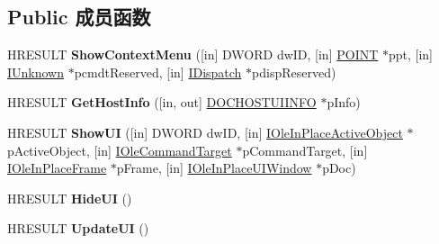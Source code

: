 \subsection*{Public 成员函数}
\begin{DoxyCompactItemize}
\item 
\mbox{\label{interface_i_doc_host_u_i_handler_a4e5a7503b05be4342bed42a992243621}} 
H\+R\+E\+S\+U\+LT {\bfseries Show\+Context\+Menu} (\mbox{[}in\mbox{]} D\+W\+O\+RD dw\+ID, \mbox{[}in\mbox{]} \hyperlink{structtag_p_o_i_n_t}{P\+O\+I\+NT} $\ast$ppt, \mbox{[}in\mbox{]} \hyperlink{interface_i_unknown}{I\+Unknown} $\ast$pcmdt\+Reserved, \mbox{[}in\mbox{]} \hyperlink{interface_i_dispatch}{I\+Dispatch} $\ast$pdisp\+Reserved)
\item 
\mbox{\label{interface_i_doc_host_u_i_handler_a50a5fd8bb9006df44c170c74c1586d5d}} 
H\+R\+E\+S\+U\+LT {\bfseries Get\+Host\+Info} (\mbox{[}in, out\mbox{]} \hyperlink{struct_i_doc_host_u_i_handler_1_1___d_o_c_h_o_s_t_u_i_i_n_f_o}{D\+O\+C\+H\+O\+S\+T\+U\+I\+I\+N\+FO} $\ast$p\+Info)
\item 
\mbox{\label{interface_i_doc_host_u_i_handler_af5382165442406ea798d48e0fa2e3735}} 
H\+R\+E\+S\+U\+LT {\bfseries Show\+UI} (\mbox{[}in\mbox{]} D\+W\+O\+RD dw\+ID, \mbox{[}in\mbox{]} \hyperlink{interface_i_ole_in_place_active_object}{I\+Ole\+In\+Place\+Active\+Object} $\ast$p\+Active\+Object, \mbox{[}in\mbox{]} \hyperlink{interface_i_ole_command_target}{I\+Ole\+Command\+Target} $\ast$p\+Command\+Target, \mbox{[}in\mbox{]} \hyperlink{interface_i_ole_in_place_frame}{I\+Ole\+In\+Place\+Frame} $\ast$p\+Frame, \mbox{[}in\mbox{]} \hyperlink{interface_i_ole_in_place_u_i_window}{I\+Ole\+In\+Place\+U\+I\+Window} $\ast$p\+Doc)
\item 
\mbox{\label{interface_i_doc_host_u_i_handler_aa6e932cc5e7d4525d3d49fc42c7fead0}} 
H\+R\+E\+S\+U\+LT {\bfseries Hide\+UI} ()
\item 
\mbox{\label{interface_i_doc_host_u_i_handler_a5415fc22f479cd065c95f640dd86e7cc}} 
H\+R\+E\+S\+U\+LT {\bfseries Update\+UI} ()
\item 
\mbox{\label{interface_i_doc_host_u_i_handler_a1e4789f4907a35054331a35f030e8af2}} 

\end{DoxyCompactItemize}
